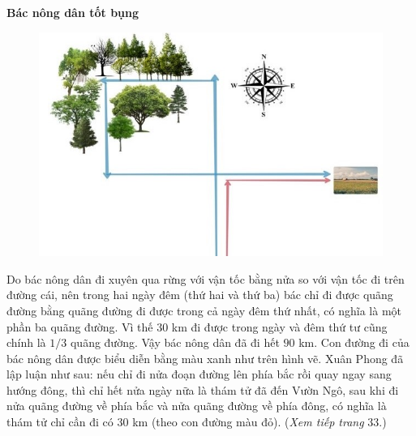 \begin{multicols}{2}
	\textbf{\color{quantoan}Bác nông dân tốt bụng}
	\begin{figure}[H]
			\vspace*{-5pt}
			\centering
			\captionsetup{labelformat= empty, justification=centering}
			\includegraphics[width= 0.95\linewidth]{lgxp}
			\vspace*{-10pt}
		\end{figure}
	Do bác nông dân đi xuyên qua rừng với vận tốc bằng nửa so với vận tốc đi trên đường cái, nên trong hai ngày đêm (thứ hai và thứ ba) bác chỉ đi được quãng đường bằng quãng đường đi được trong cả ngày đêm thứ nhất, có nghĩa là một phần ba quãng đường. Vì thế $30$ km đi được trong ngày và đêm thứ tư cũng chính là $1/3$ quãng đường. Vậy bác nông dân đã đi hết $90$ km. Con đường đi của bác nông dân được biểu diễn bằng màu xanh như trên hình vẽ. 
	\vskip 0.05cm
	Xuân Phong đã lập luận như sau: nếu chỉ đi nửa đoạn đường lên phía bắc rồi quay ngay 	sang hướng đông, thì chỉ hết nửa ngày nữa là thám tử đã đến Vườn Ngô, sau khi đi nửa quãng đường về phía bắc và nửa quãng đường về phía đông, có nghĩa là thám tử chỉ cần đi có $30$ km (theo con đường màu đỏ). 
	\vskip 0.1cm
	\hfill (\textit{Xem tiếp trang} $33$.)

\end{multicols}
